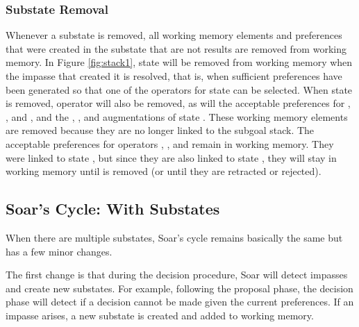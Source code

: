 \subsubsection*{Substate Removal}

Whenever a substate is removed, all working memory elements and
preferences that were created in the substate that are not
results are removed from working memory. In Figure \ref{fig:stack1},
state  will be removed from working memory when the impasse
that created it is resolved, that is, when sufficient preferences have
been generated so that one of the operators for state  can be
selected. When state  is removed, operator  will also be removed,
as will the acceptable
preferences for , , and , and the
, , and  augmentations of state
. These working memory elements are removed because they are no
longer linked to the subgoal stack. The acceptable preferences for
operators , , and  remain in working memory. They
were linked to state , but since they are also linked to state
, they will stay in working memory until  is removed (or
until they are retracted or rejected).

\subsection{Soar's Cycle: With Substates}
\label{ARCH-decision-substates}

When there are multiple substates, Soar's cycle remains basically the
same but has a few minor changes.  


The first change is that during the decision procedure, Soar will detect
impasses and create new substates.  For example, following the proposal
phase, the decision phase will detect if a decision cannot be made given
the current preferences.  If an impasse arises, a new substate is
created and added to working memory.  


